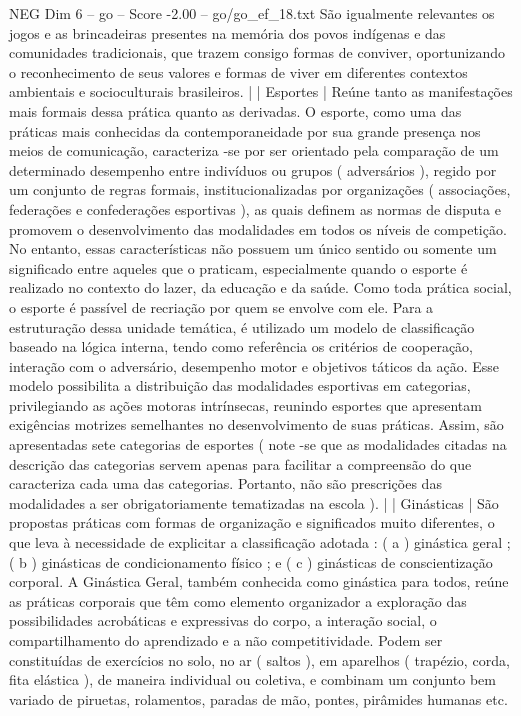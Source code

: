 \begin{textsample}{NEG Dim 6 – go – Score -2.00 – go/go\_ef\_18.txt}
São igualmente relevantes os jogos e as brincadeiras presentes na memória dos povos indígenas e das comunidades tradicionais, que trazem consigo formas de conviver, oportunizando o reconhecimento de seus valores e formas de viver em diferentes contextos ambientais e socioculturais brasileiros. | | Esportes | Reúne tanto as manifestações mais formais dessa prática quanto as derivadas.
O esporte, como uma das práticas mais conhecidas da contemporaneidade por sua grande presença nos meios de comunicação, caracteriza -se por ser orientado pela comparação de um determinado desempenho entre indivíduos ou grupos ( adversários ), regido por um conjunto de regras formais, institucionalizadas por organizações ( associações, federações e confederações esportivas ), as quais definem as normas de disputa e promovem o desenvolvimento das modalidades em todos os níveis de competição.
No entanto, essas características não possuem um único sentido ou somente um significado entre aqueles que o praticam, especialmente quando o esporte é realizado no contexto do lazer, da educação e da saúde.
Como toda prática social, o esporte é passível de recriação por quem se envolve com ele.
Para a estruturação dessa unidade temática, é utilizado um modelo de classificação baseado na lógica interna, tendo como referência os critérios de cooperação, interação com o adversário, desempenho motor e objetivos táticos da ação.
Esse modelo possibilita a distribuição das modalidades esportivas em categorias, privilegiando as ações motoras intrínsecas, reunindo esportes que apresentam exigências motrizes semelhantes no desenvolvimento de suas práticas.
Assim, são apresentadas sete categorias de esportes ( note -se que as modalidades citadas na descrição das categorias servem apenas para facilitar a compreensão do que caracteriza cada uma das categorias.
Portanto, não são prescrições das modalidades a ser obrigatoriamente tematizadas na escola ). | | Ginásticas | São propostas práticas com formas de organização e significados muito diferentes, o que leva à necessidade de explicitar a classificação adotada : ( a ) ginástica geral ; ( b ) ginásticas de condicionamento físico ; e ( c ) ginásticas de conscientização corporal.
A Ginástica Geral, também conhecida como ginástica para todos, reúne as práticas corporais que têm como elemento organizador a exploração das possibilidades acrobáticas e expressivas do corpo, a interação social, o compartilhamento do aprendizado e a não competitividade.
Podem ser constituídas de exercícios no solo, no ar ( saltos ), em aparelhos ( trapézio, corda, fita elástica ), de maneira individual ou coletiva, e combinam um conjunto bem variado de piruetas, rolamentos, paradas de mão, pontes, pirâmides humanas etc.

\end{textsample}

